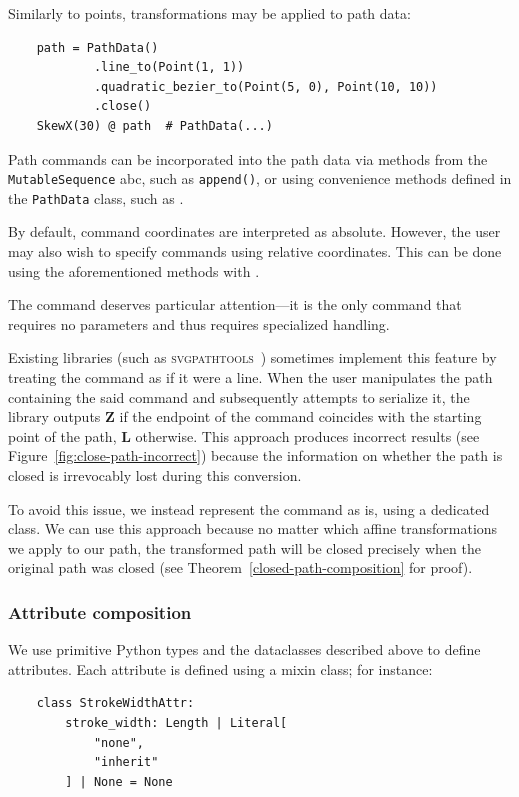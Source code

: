Similarly to points, transformations may be applied to path data:
\begin{verbatim}
    path = PathData()
            .line_to(Point(1, 1))
            .quadratic_bezier_to(Point(5, 0), Point(10, 10))
            .close()
    SkewX(30) @ path  # PathData(...)
\end{verbatim}

Path commands can be incorporated into the path data via methods from the \texttt{MutableSequence} \gls{abc}, such as \texttt{append()}, or using convenience methods defined in the \texttt{PathData} class, such as .

By default, command coordinates are interpreted as absolute. However, the user may also wish to specify commands using relative coordinates. This can be done using the aforementioned methods with .

The  command deserves particular attention---it is the only command that requires no parameters and thus requires specialized handling.

Existing libraries (such as \textsc{svgpathtools}~\cite{svgpathtools}) sometimes implement this feature by treating the command as if it were a line. When the user manipulates the path containing the said command and subsequently attempts to serialize it, the library outputs \textbf{Z} if the endpoint of the  command coincides with the starting point of the path, \textbf{L} otherwise. This approach produces incorrect results (see Figure~\ref{fig:close-path-incorrect}) because the information on whether the path is closed is irrevocably lost during this conversion.

To avoid this issue, we instead represent the command as is, using a dedicated class. We can use this approach because no matter which affine transformations we apply to our path, the transformed path will be closed precisely when the original path was closed (see Theorem~\ref{closed-path-composition} for proof).

\subsubsection{Attribute composition}\label{impl:representation:attr-composition}

We use primitive Python types and the dataclasses described above to define attributes. Each attribute is defined using a mixin class; for instance:
\begin{verbatim}
    class StrokeWidthAttr:
        stroke_width: Length | Literal[
            "none",
            "inherit"
        ] | None = None
\end{verbatim}

